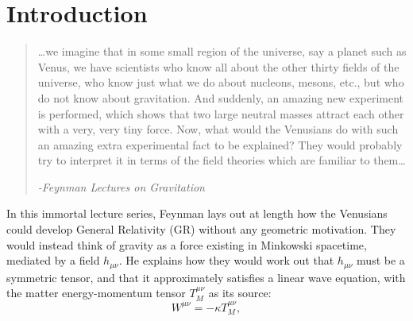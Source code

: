 \documentclass[aps,physrev,preprint,groupedaddress]{revtex4-2}
\begin{document}

\maketitle

\section{Introduction}
\begin{quotation}
\ldots{}we imagine that in some small region of the universe, say a planet such as Venus, we have scientists who know all about the other
thirty fields of the universe, who know just what we do about nucleons,
mesons, etc., but who do not know about gravitation. And suddenly, an
amazing new experiment is performed, which shows that two large neutral
masses attract each other with a very, very tiny force. Now, what would
the Venusians do with such an amazing extra experimental fact to be
explained? They would probably try to interpret it in terms of the field
theories which are familiar to them\ldots{}

\textit{-Feynman Lectures on Gravitation}\cite{Feynlectures}
\end{quotation}
In this immortal lecture series, Feynman lays out at length how the Venusians
could develop General Relativity (GR) without any geometric motivation. They would instead think of gravity as a force existing in Minkowski spacetime, mediated by a field \(h_{\mu\nu}\). He explains how they would work out that \(h_{\mu\nu}\) must be a symmetric tensor, and that it approximately satisfies a linear wave equation, with the matter energy-momentum tensor \(T_{M}^{\mu\nu}\) as its source:
\begin{equation} \label{lin}
W^{\mu\nu} = - \kappa T_{M}^{\mu\nu},
\end{equation}
\end{document}
